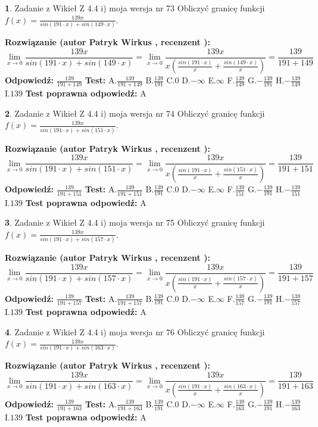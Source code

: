 \documentclass[12pt, a4paper]{article}
\theoremstyle{definition} %
\newtheorem{zad}{}
\newcommand{\zadStart}[1]{\begin{zad}#1\newline}
\newcommand{\zadStop}{\end{zad}}
\newcommand{\rozwStart}[2]{\noindent \textbf{Rozwiązanie (autor #1 , recenzent #2): }\newline}
\newcommand{\rozwStop}{\newline}
\newcommand{\odpStart}{\noindent \textbf{Odpowiedź:}\newline}
\newcommand{\odpStop}{\newline}
\newcommand{\testStart}{\noindent \textbf{Test:}\newline}
\newcommand{\testStop}{\newline}
\newcommand{\kluczStart}{\noindent \textbf{Test poprawna odpowiedź:}\newline}
\newcommand{\kluczStop}{\newline}
\begin{document}
\zadStart{Zadanie z Wikieł Z 4.4 i) moja wersja nr 73}
Obliczyć granicę funkcji $f(x)=\frac{139x}{sin(191\cdot x) +sin(149\cdot x)}$.
\zadStop
\rozwStart{Patryk Wirkus}{}
$$\lim\limits_{x\to 0}\frac{139x}{sin(191\cdot x) +sin(149\cdot x)}=\lim\limits_{x\to 0}\frac{139x}{x(\frac{sin(191\cdot x)}{x}+\frac{sin(149\cdot x)}{x})}=\frac{139}{191+149}$$
\rozwStop
\odpStart
$\frac{139}{191+149}$
\odpStop
\testStart
A.$\frac{139}{191+149}$
B.$\frac{139}{191}$
C.$0$
D.$-\infty$
E.$\infty$
F.$\frac{139}{149}$
G.$-\frac{139}{191}$
H.$-\frac{139}{149}$
I.$139$
\testStop
\kluczStart
A
\kluczStop



\zadStart{Zadanie z Wikieł Z 4.4 i) moja wersja nr 74}
Obliczyć granicę funkcji $f(x)=\frac{139x}{sin(191\cdot x) +sin(151\cdot x)}$.
\zadStop
\rozwStart{Patryk Wirkus}{}
$$\lim\limits_{x\to 0}\frac{139x}{sin(191\cdot x) +sin(151\cdot x)}=\lim\limits_{x\to 0}\frac{139x}{x(\frac{sin(191\cdot x)}{x}+\frac{sin(151\cdot x)}{x})}=\frac{139}{191+151}$$
\rozwStop
\odpStart
$\frac{139}{191+151}$
\odpStop
\testStart
A.$\frac{139}{191+151}$
B.$\frac{139}{191}$
C.$0$
D.$-\infty$
E.$\infty$
F.$\frac{139}{151}$
G.$-\frac{139}{191}$
H.$-\frac{139}{151}$
I.$139$
\testStop
\kluczStart
A
\kluczStop



\zadStart{Zadanie z Wikieł Z 4.4 i) moja wersja nr 75}
Obliczyć granicę funkcji $f(x)=\frac{139x}{sin(191\cdot x) +sin(157\cdot x)}$.
\zadStop
\rozwStart{Patryk Wirkus}{}
$$\lim\limits_{x\to 0}\frac{139x}{sin(191\cdot x) +sin(157\cdot x)}=\lim\limits_{x\to 0}\frac{139x}{x(\frac{sin(191\cdot x)}{x}+\frac{sin(157\cdot x)}{x})}=\frac{139}{191+157}$$
\rozwStop
\odpStart
$\frac{139}{191+157}$
\odpStop
\testStart
A.$\frac{139}{191+157}$
B.$\frac{139}{191}$
C.$0$
D.$-\infty$
E.$\infty$
F.$\frac{139}{157}$
G.$-\frac{139}{191}$
H.$-\frac{139}{157}$
I.$139$
\testStop
\kluczStart
A
\kluczStop



\zadStart{Zadanie z Wikieł Z 4.4 i) moja wersja nr 76}
Obliczyć granicę funkcji $f(x)=\frac{139x}{sin(191\cdot x) +sin(163\cdot x)}$.
\zadStop
\rozwStart{Patryk Wirkus}{}
$$\lim\limits_{x\to 0}\frac{139x}{sin(191\cdot x) +sin(163\cdot x)}=\lim\limits_{x\to 0}\frac{139x}{x(\frac{sin(191\cdot x)}{x}+\frac{sin(163\cdot x)}{x})}=\frac{139}{191+163}$$
\rozwStop
\odpStart
$\frac{139}{191+163}$
\odpStop
\testStart
A.$\frac{139}{191+163}$
B.$\frac{139}{191}$
C.$0$
D.$-\infty$
E.$\infty$
F.$\frac{139}{163}$
G.$-\frac{139}{191}$
H.$-\frac{139}{163}$
I.$139$
\testStop
\kluczStart
A
\kluczStop
\end{document}
